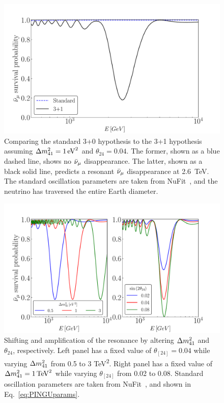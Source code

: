 \begin{figure}
    \centering
        \includegraphics[width=1\linewidth]{figures/sterile_resonance.pdf}
        \caption{Comparing the standard 3+0 hypothesis to the
        3+1 hypothesis assuming $\dm[41] = \SI{1}{\eV \squared}$ and $\theta_{24} = 0.04$.
        The former, shown as a blue dashed line, shows no $\bar{\nu}_\mu$ disappearance.
        The latter, shown as a black solid line, predicts a resonant $\bar{\nu}_\mu$ disappearance at \SI{2.6}{\TeV}.
        The standard oscillation parameters are taken from NuFit~\cite{nufit}, and the 
        neutrino has traversed the entire Earth diameter.}\label{fig:sterile_resonance}
    \end{figure}
    \begin{figure}
        \includegraphics[width=1\linewidth]{figures/resonance_shift.pdf}
        \caption{Shifting and amplification of the resonance by altering $\dm[41]$ and $\theta_{24}$, respectively.
        Left panel has a fixed value of $\theta_[24] = 0.04$ while varying $\dm[41]$ from 0.5 to 3 \si{\TeV^2}.
        Right panel has a fixed value of $\dm[41] = \SI{1}{\TeV^2}$ while varying $\theta_[24]$ from 0.02 to 0.08.
        Standard oscillation parameters are taken from NuFit~\cite{nufit}, and shown in Eq.~\ref{eq:PINGUparams}.}\label{fig:resonance_shift}
\end{figure}
